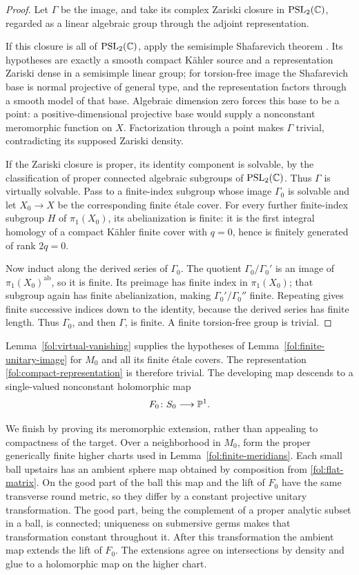 \begin{proof}
Let $\Gamma$ be the image, and take its complex Zariski closure in
$\mathrm{PSL}_2(\mathbb{C})$, regarded as a linear algebraic group through
the adjoint representation.

If this closure is all of $\mathrm{PSL}_2(\mathbb{C})$, apply the
semisimple Shafarevich theorem
\cite[Theorem~1]{CCE}.  Its hypotheses are exactly a smooth compact
K\"ahler source and a representation Zariski dense in a semisimple
linear group; for torsion-free image the Shafarevich base is normal
projective of general type, and the representation factors through
a smooth model of that base.  Algebraic dimension zero forces this
base to be a point: a positive-dimensional projective base would
supply a nonconstant meromorphic function on $X$.  Factorization
through a point makes $\Gamma$ trivial, contradicting its supposed
Zariski density.

If the Zariski closure is proper, its identity component is solvable,
by the classification of proper connected algebraic subgroups of
$\mathrm{PSL}_2(\mathbb{C})$.  Thus $\Gamma$ is virtually solvable.  Pass to
a finite-index subgroup whose image $\Gamma_0$ is solvable and let
$X_0\to X$ be the corresponding finite \'etale cover.
For every further finite-index subgroup $H$ of $\pi_1(X_0)$, its
abelianization is finite: it is the first integral homology of a
compact K\"ahler finite cover with $q=0$, hence is finitely generated
of rank $2q=0$.

Now induct along the derived series of $\Gamma_0$.
The quotient $\Gamma_0/\Gamma_0'$ is an image of
$\pi_1(X_0)^{\mathrm{ab}}$, so it is finite.
Its preimage has finite index in $\pi_1(X_0)$; that subgroup again
has finite abelianization, making $\Gamma_0'/\Gamma_0''$ finite.
Repeating gives finite successive indices down to the identity,
because the derived series has finite length.
Thus $\Gamma_0$, and then $\Gamma$, is finite.
A finite torsion-free group is trivial.
\end{proof}

Lemma~\ref{fol:virtual-vanishing} supplies the hypotheses of
Lemma~\ref{fol:finite-unitary-image} for $M_0$ and all its finite
\'etale covers.  The representation
\eqref{fol:compact-representation} is therefore trivial.  The
developing map descends to a single-valued nonconstant holomorphic map
\[
 F_0\colon S_0\longrightarrow\mathbb{P}^1.
\]

We finish by proving its meromorphic extension, rather than appealing
to compactness of the target.  Over a neighborhood in $M_0$, form the
proper generically finite higher charts used in
Lemma~\ref{fol:finite-meridians}.  Each small ball upstairs has an
ambient sphere map obtained by composition from
\eqref{fol:flat-matrix}.  On the good part of the ball this map and
the lift of $F_0$ have the same transverse round metric, so they differ
by a constant projective unitary transformation.  The good part,
being the complement of a proper analytic subset in a ball, is
connected; uniqueness on submersive germs makes that transformation
constant throughout it.  After this transformation the ambient map
extends the lift of $F_0$.  The extensions agree on intersections
by density and glue to a holomorphic map on the higher chart.

